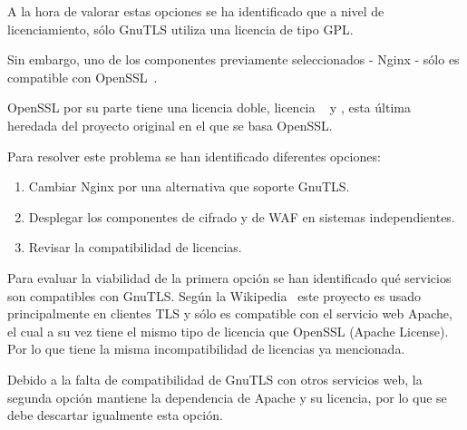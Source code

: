\par A la hora de valorar estas opciones se ha identificado que a nivel de licenciamiento, sólo GnuTLS utiliza una licencia de tipo GPL.
\par Sin embargo, uno de los componentes previamente seleccionados - Nginx - sólo es compatible con OpenSSL~\cite{opensslnginx}.
\par OpenSSL por su parte tiene una licencia doble, licencia ~\cite[Apache License 1.0]{apachelicense10} y \cite[licencia SSLeay]{ssleaylicense}, esta última heredada del proyecto original en el que se basa OpenSSL.

\par Para resolver este problema se han identificado diferentes opciones:
\begin{enumerate}
  \item Cambiar Nginx por una alternativa que soporte GnuTLS.
  \item Desplegar los componentes de cifrado y de WAF en sistemas independientes.
  \item Revisar la compatibilidad de licencias.
\end{enumerate}

\par Para evaluar la viabilidad de la primera opción se han identificado qué servicios son compatibles con GnuTLS. Según la Wikipedia~\cite{wiki:gnutls} este proyecto es usado principalmente en clientes TLS y sólo es compatible con el servicio
web Apache, el cual a su vez tiene el mismo tipo de licencia que OpenSSL (Apache License). Por lo que tiene la misma incompatibilidad de licencias ya mencionada.

\par Debido a la falta de compatibilidad de GnuTLS con otros servicios web, la segunda opción mantiene la dependencia de Apache y su licencia, por lo que  se debe descartar igualmente esta opción.

